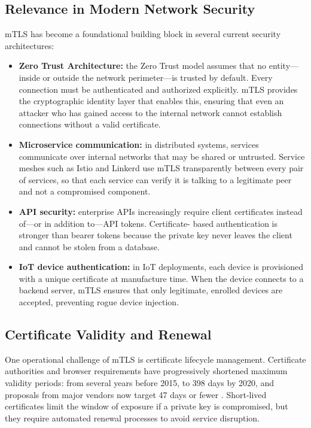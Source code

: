 \documentclass[10pt,twocolumn]{article}
\begin{document}
\subsection{Relevance in Modern Network Security}

mTLS has become a foundational building block in several current security
architectures:

\begin{itemize}
  \item \textbf{Zero Trust Architecture:} the Zero Trust model assumes that
        no entity---inside or outside the network perimeter---is trusted by
        default. Every connection must be authenticated and authorized
        explicitly. mTLS provides the cryptographic identity layer that
        enables this, ensuring that even an attacker who has gained access
        to the internal network cannot establish connections without a valid
        certificate.

  \item \textbf{Microservice communication:} in distributed systems, services
        communicate over internal networks that may be shared or untrusted.
        Service meshes such as Istio and Linkerd use mTLS transparently
        between every pair of services, so that each service can verify it
        is talking to a legitimate peer and not a compromised component.

  \item \textbf{API security:} enterprise APIs increasingly require client
        certificates instead of---or in addition to---API tokens. Certificate-
        based authentication is stronger than bearer tokens because the private
        key never leaves the client and cannot be stolen from a database.

  \item \textbf{IoT device authentication:} in IoT deployments, each device
        is provisioned with a unique certificate at manufacture time. When
        the device connects to a backend server, mTLS ensures that only
        legitimate, enrolled devices are accepted, preventing rogue device
        injection.
\end{itemize}

\subsection{Certificate Validity and Renewal}

One operational challenge of mTLS is certificate lifecycle management.
Certificate authorities and browser requirements have progressively shortened
maximum validity periods: from several years before 2015, to 398 days by
2020, and proposals from major vendors now target 47 days or fewer
\cite{rfc5280}. Short-lived certificates limit the window of exposure if a
private key is compromised, but they require automated renewal processes to
avoid service disruption.
\end{document}
